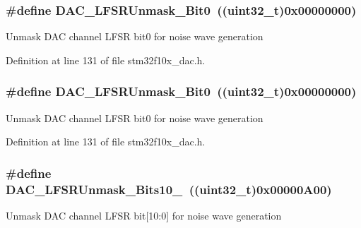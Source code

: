 \subsubsection[{\texorpdfstring{D\+A\+C\+\_\+\+L\+F\+S\+R\+Unmask\+\_\+\+Bit0}{DAC_LFSRUnmask_Bit0}}]{\setlength{\rightskip}{0pt plus 5cm}\#define D\+A\+C\+\_\+\+L\+F\+S\+R\+Unmask\+\_\+\+Bit0~(({\bf uint32\+\_\+t})0x00000000)}\hypertarget{group___d_a_c__lfsrunmask__triangleamplitude_ga60794fd5092a332cfa82e1cee13945fc}{}\label{group___d_a_c__lfsrunmask__triangleamplitude_ga60794fd5092a332cfa82e1cee13945fc}
Unmask D\+AC channel L\+F\+SR bit0 for noise wave generation 

Definition at line 131 of file stm32f10x\+\_\+dac.\+h.

\subsubsection[{\texorpdfstring{D\+A\+C\+\_\+\+L\+F\+S\+R\+Unmask\+\_\+\+Bit0}{DAC_LFSRUnmask_Bit0}}]{\setlength{\rightskip}{0pt plus 5cm}\#define D\+A\+C\+\_\+\+L\+F\+S\+R\+Unmask\+\_\+\+Bit0~(({\bf uint32\+\_\+t})0x00000000)}\hypertarget{group___d_a_c__lfsrunmask__triangleamplitude_ga60794fd5092a332cfa82e1cee13945fc}{}\label{group___d_a_c__lfsrunmask__triangleamplitude_ga60794fd5092a332cfa82e1cee13945fc}
Unmask D\+AC channel L\+F\+SR bit0 for noise wave generation 

Definition at line 131 of file stm32f10x\+\_\+dac.\+h.

\subsubsection[{\texorpdfstring{D\+A\+C\+\_\+\+L\+F\+S\+R\+Unmask\+\_\+\+Bits10\+\_\+0}{DAC_LFSRUnmask_Bits10_0}}]{\setlength{\rightskip}{0pt plus 5cm}\#define D\+A\+C\+\_\+\+L\+F\+S\+R\+Unmask\+\_\+\+Bits10\+\_~(({\bf uint32\+\_\+t})0x00000\+A00)}\hypertarget{group___d_a_c__lfsrunmask__triangleamplitude_ga7670f0e10f062571d0e56027ef653228}{}\label{group___d_a_c__lfsrunmask__triangleamplitude_ga7670f0e10f062571d0e56027ef653228}
Unmask D\+AC channel L\+F\+SR bit\mbox{[}10\+:0\mbox{]} for noise wave generation 

